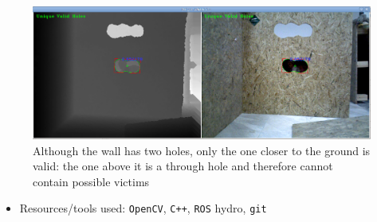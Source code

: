 \begin{figure}[H]\centering
  \includegraphics[scale=0.35]{images/unique_holes.png}
  \caption{\small Although the wall has two holes, only the one closer to the
           ground is valid: the one above it is a through hole and
           therefore cannot contain possible victims}
  \label{fig:holes}
\end{figure}

\begin{itemize}
  \item Resources/tools used: \texttt{OpenCV}, \texttt{C++}, \texttt{ROS} hydro, \texttt{git}
\end{itemize}
